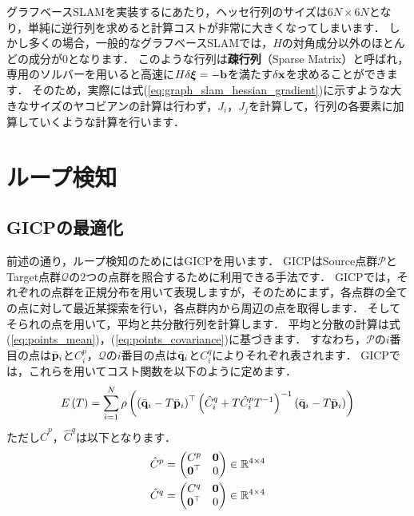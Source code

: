 グラフベースSLAMを実装するにあたり，ヘッセ行列のサイズは$6N \times 6N$となり，単純に逆行列を求めると計算コストが非常に大きくなってしまいます．
しかし多くの場合，一般的なグラフベースSLAMでは，$H$の対角成分以外のほとんどの成分が0となります．
このような行列は{\bf 疎行列}（Sparse Matrix）と呼ばれ，専用のソルバーを用いると高速に$H \delta \boldsymbol \xi = -{\bf b}$を満たす$\delta {\bf x}$を求めることができます．
そのため，実際には式(\ref{eq:graph_slam_hessian_gradient})に示すような大きなサイズのヤコビアンの計算は行わず，$J_{i}$，$J_{j}$を計算して，行列の各要素に加算していくような計算を行います．













\section{ループ検知}
\label{subsec:gicp}

\subsection{GICPの最適化}

前述の通り，ループ検知のためにはGICPを用います．
GICPはSource点群$\mathcal{P}$とTarget点群$\mathcal{Q}$の2つの点群を照合するために利用できる手法です．
GICPでは，それぞれの点群を正規分布を用いて表現しますが，そのためにまず，各点群の全ての点に対して最近某探索を行い，各点群内から周辺の点を取得します．
そしてそられの点を用いて，平均と共分散行列を計算します．
平均と分散の計算は式(\ref{eq:points_mean})，(\ref{eq:points_covariance})に基づきます．
すなわち，$\mathcal{P}$の$i$番目の点は$\bar{ {\bf p} }_{i}$と$C_{i}^{p}$，$\mathcal{Q}$の$i$番目の点は$\bar{ {\bf q} }_{i}$と$C_{i}^{q}$によりそれぞれ表されます．
GICPでは，これらを用いてコスト関数を以下のように定めます．
%
\begin{align}
  E \left( T \right) = \sum_{i=1}^{N} \rho \left( \left( \bar{ {\bf q} }_{i} - T \bar{ {\bf p} }_{i} \right)^{\top} \left( \hat{C}_{i}^{q} + T \hat{C}_{i}^{p} T^{-1} \right)^{-1} \left( \bar{ {\bf q} }_{i} - T \bar{ {\bf p} }_{i} \right) \right)
  \label{eq:gicp_cost_function}
\end{align}
%
ただし$\hat{C}^{p}$，$\hat{C}^{q}$は以下となります．
%
\begin{align}
  \begin{gathered}
    \hat{C}^{p} = \left( \begin{matrix}
      C^{p}          & {\bf 0} \\
      {\bf 0}^{\top} & 0
    \end{matrix} \right) \in \mathbb{R}^{4 \times 4} \\
%
    \hat{C}^{q} = \left( \begin{matrix}
      C^{q}          & {\bf 0} \\
      {\bf 0}^{\top} & 0
    \end{matrix} \right) \in \mathbb{R}^{4 \times 4}
  \end{gathered}
\end{align}
%

